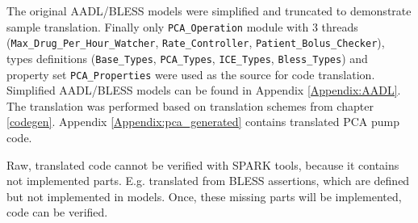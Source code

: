 The original AADL/BLESS models were simplified and truncated to demonstrate sample translation. Finally only \lstinline{PCA_Operation} module with 3 threads (\lstinline{Max_Drug_Per_Hour_Watcher}, \lstinline{Rate_Controller}, \lstinline{Patient_Bolus_Checker}), types definitions (\lstinline{Base_Types}, \lstinline{PCA_Types}, \lstinline{ICE_Types}, \lstinline{Bless_Types}) and property set \lstinline{PCA_Properties} were used as the source for code translation. Simplified AADL/BLESS models can be found in Appendix \ref{Appendix:AADL}. The translation was performed based on translation schemes from chapter \ref{codegen}. Appendix \ref{Appendix:pca_generated} contains translated PCA pump code. 

Raw, translated code cannot be verified with SPARK tools, because it contains not implemented parts. E.g. translated from BLESS assertions, which are defined but not implemented in models. Once, these missing parts will be implemented, code can be verified.

